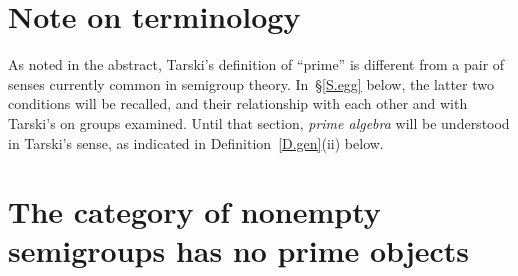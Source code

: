 \documentclass{amsart}
\numberwithin{equation}{section}
\numberwithin{theorem}{section}
\begin{document}
\begin{abstract}
If $\mathcal{C}$ is a category of algebras closed under finite
direct products, and $M_\mathcal{C}$ the commutative monoid of
isomorphism classes of members of $\mathcal{C},$ with operation
induced by
direct product, A.\,Tarski defined a nonidentity element $p$ of
$M_\mathcal{C}$ to be {\em prime} if, whenever it divides a
product of two elements, it divides one of them,
and defined an object of $\mathcal{C}$ to be
prime if its isomorphism class has this property.

McKenzie, McNulty and Taylor \cite[p.\,263]{MMT} ask whether
the category of nonempty semigroups has any objects that
are prime in this sense.
We show in \S\ref{S.Main} that it does not.
However, for the category of monoids, and some other subcategories
of semigroups, we obtain examples of prime objects
in~\S\S\ref{S.prep}-\ref{S.N_etc}.
In \S\ref{S.more_MMT_Qs} two related questions
from~\cite{MMT}, open so far as I know, are recalled.

In~\S\ref{S.egg}, which can be read independently of the rest
of this note, we recall two conditions called primeness by
semigroup theorists, and obtain results and examples on the
relationships among those
conditions and Tarski's in categories of groups.
\S\ref{S.Rprime&var} notes a characterization of one
of those conditions on finite algebras in an arbitrary variety.

Several questions are raised.
\end{abstract}
\maketitle
\vspace{-.5em}
\section{Note on terminology}\label{S.termin}

As noted in the abstract, Tarski's definition of
``prime'' is different from a pair of
senses currently common in semigroup theory.
In~\S\ref{S.egg} below, the latter two conditions will be recalled,
and their relationship with each other and with Tarski's
on groups examined.
Until that section, {\em prime algebra} will be
understood in Tarski's sense, as indicated
in Definition~\ref{D.gen}(ii) below.

\section{The category of nonempty
semigroups has no prime objects}\label{S.Main}
\end{document}
